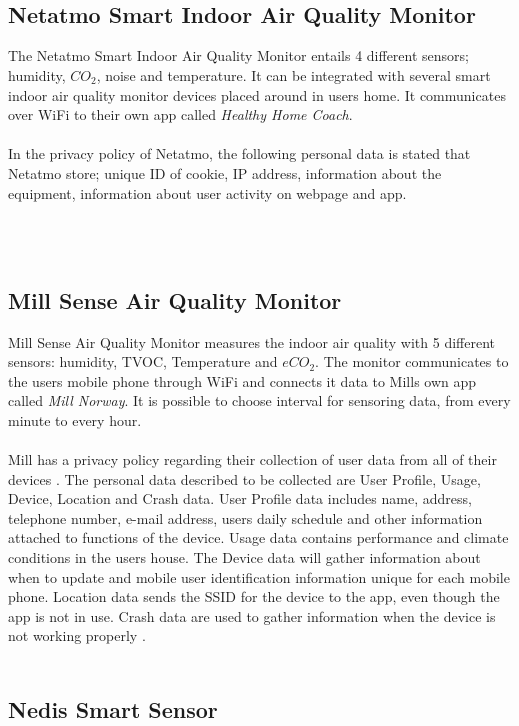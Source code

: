 \\\\
\FloatBarrier
\subsection{Netatmo Smart Indoor Air Quality Monitor}
The Netatmo Smart Indoor Air Quality Monitor entails 4 different sensors; humidity, \(CO_2\), noise and temperature. It can be integrated with several smart indoor air quality monitor devices placed around in users home. It communicates over WiFi to their own app called \textit{Healthy Home Coach}. 
\\\\
In the privacy policy of Netatmo, the following personal data is stated that Netatmo store; unique ID of cookie, IP address, information about the equipment, information about user activity on webpage and app. 

\\\\
\subsection{Mill Sense Air Quality Monitor}
Mill Sense Air Quality Monitor measures the indoor air quality with 5 different sensors: humidity, TVOC, Temperature and \(eCO_2\). \cite{Mill} The monitor communicates to the users mobile phone through WiFi and connects it data to Mills own app called \textit{Mill Norway}. It is possible to choose interval for sensoring data, from every minute to every hour. 
\\\\
Mill has a privacy policy regarding their collection of user data from all of their devices \cite{MillPrivacy}. The personal data described to be collected are User Profile, Usage, Device, Location and Crash data. User Profile data includes name, address, telephone number, e-mail address, users daily schedule and other information attached to functions of the device. Usage data contains performance and climate conditions in the users house. The Device data will gather information about when to update and mobile user identification information unique for each mobile phone. Location data sends the SSID for the device to the app, even though the app is not in use. Crash data are used to gather information when the device is not working properly \cite{MillPrivacy}. 
\\\\
\subsection{Nedis Smart Sensor}


